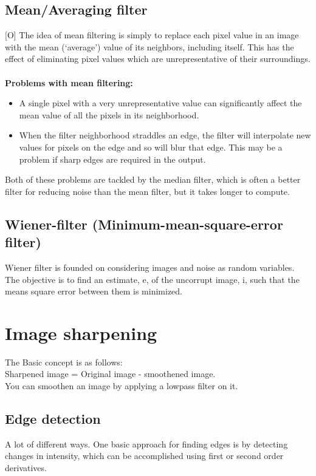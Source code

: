 \documentclass[12pt]{article}
\begin{document}
	\subsection{Mean/Averaging filter}
	[O] The idea of mean filtering is simply to replace each pixel value in an image with the 
	mean (`average') value of its neighbors, including itself. This has the effect of eliminating 
	pixel values which are unrepresentative of their surroundings.\\
	\\	
	\textbf{Problems with mean filtering:}
	\begin{itemize}
		\item A single pixel with a very unrepresentative value can significantly affect 
		the mean value of all the pixels in its neighborhood. 
		\item When the filter neighborhood straddles an edge, the filter will interpolate 
		new values for pixels on the edge and so will blur that edge. This may be a problem
		if sharp edges are required in the output. 
	\end{itemize}
	Both of these problems are tackled by the median filter, which is often a better filter 
	for reducing noise than the mean filter, but it takes longer to compute. 

    \subsection{Wiener-filter (Minimum-mean-square-error filter)}
    Wiener filter is founded on considering images and noise as random variables.
    The objective is to find an estimate, e, of the uncorrupt image, i, such that the means square error between them is minimized. 
    
%	
%	
\section{Image sharpening}
	The Basic concept is as follows:\\
	Sharpened image = Original image - smoothened image.\\
	You can smoothen an image by applying a lowpass filter on it.
	
	\subsection{Edge detection}
	A lot of different ways. One basic approach for finding edges is by detecting changes in intensity, 
	which can be accomplished using first or second order derivatives. \\
	
\end{document}
